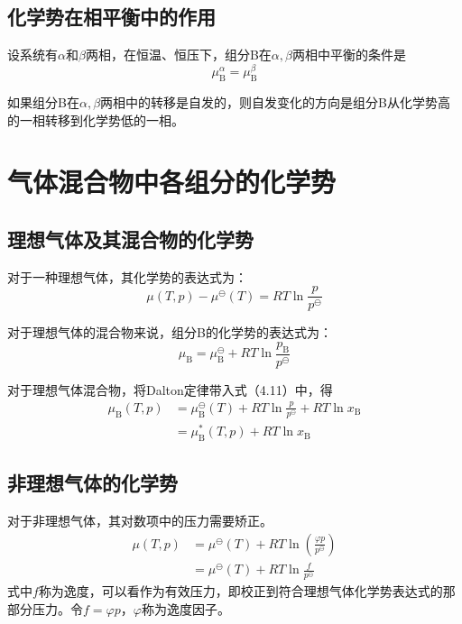 \documentclass[lang=cn,newtx,10pt,scheme=chinese]{elegantbook}
\begin{document}
\subsection{化学势在相平衡中的作用}
设系统有$\alpha$和$\beta$两相，在恒温、恒压下，组分B在$\alpha,\beta$两相中平衡的条件是
\begin{equation}
	\mu^\alpha_\mathrm{B} = \mu^\beta_\mathrm{B}
\end{equation}

如果组分B在$\alpha,\beta$两相中的转移是自发的，则自发变化的方向是组分B从化学势高的一相转移到化学势低的一相。

\section{气体混合物中各组分的化学势}
\subsection{理想气体及其混合物的化学势}
对于一种理想气体，其化学势的表达式为：
\begin{equation}
	\mu (T,p)-\mu ^\ominus (T)=RT\ln \frac{p}{p^\ominus } 
\end{equation}

对于理想气体的混合物来说，组分B的化学势的表达式为：
\begin{equation}
	\mu _\mathrm{B}=\mu ^\ominus _\mathrm{B}+RT\ln \frac{p_\mathrm{B} }{p^\ominus }   
\end{equation}

对于理想气体混合物，将Dalton定律带入式（4.11）中，得
\begin{equation}
	\begin{aligned}
		\mu_\mathrm{B}(T,p) &=\mu^\ominus_\mathrm{B}(T)+RT\ln \frac{p}{p^\ominus}+RT\ln x_\mathrm{B} \\
		&= \mu^*_\mathrm{B}(T,p)+RT\ln x_\mathrm{B}
	\end{aligned}
\end{equation}

\subsection{非理想气体的化学势}

对于非理想气体，其对数项中的压力需要矫正。
\begin{equation}
	\begin{aligned}
		\mu(T,p) &=\mu^\ominus(T)+RT\ln \left(\frac{\varphi p}{p^\ominus}\right) \\
		&= \mu^\ominus(T)+RT \ln \frac{f}{p^\ominus}
	\end{aligned}
\end{equation}
式中$f$称为逸度，可以看作为有效压力，即校正到符合理想气体化学势表达式的那部分压力。令$f=\varphi p$，$\varphi$称为逸度因子。
\end{document}
